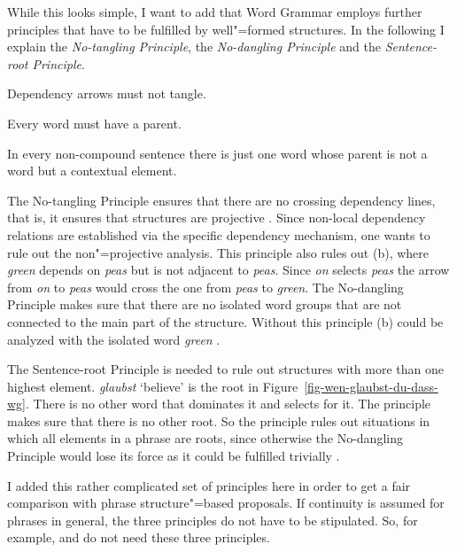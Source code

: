 While this looks simple, I want to add that Word Grammar employs further principles that have to be
fulfilled by well"=formed  structures. In the following I explain the \emph{No-tangling Principle},
the \emph{No-dangling Principle} and the \emph{Sentence-root Principle}.
\begin{principle}
  Dependency arrows must not tangle.
\end{principle}

\begin{principle}
Every word must have a parent.
\end{principle}

\begin{principle}
In every non-compound sentence there is just one word whose parent
is not a word but a contextual element.
\end{principle}

\noindent
The No-tangling Principle ensures that there are no crossing dependency lines, that is, it ensures
that structures are projective \citep[]{Hudson2000a}. Since non-local dependency relations are established via the
specific dependency mechanism, one wants to rule out the non"=projective analysis. This principle
also rules out (b), where \emph{green} depends on \emph{peas} but is not adjacent to
\emph{peas}. Since \emph{on} selects \emph{peas} the arrow from \emph{on} to \emph{peas} would cross
the one from \emph{peas} to \emph{green}.
\eal
{}
\zl
The No-dangling Principle makes sure that there are no isolated word groups that are not connected to the main part
of the structure. Without this principle (b) could be analyzed with the isolated word
\emph{green} \citep[]{Hudson2000a}.

The Sentence-root Principle is needed to rule out structures with more than one highest
element. \emph{glaubst} `believe' is the root in Figure~\ref{fig-wen-glaubst-du-dass-wg}. There is
no other word that dominates it and selects for it. The principle makes sure that there is no other
root. So the principle rules out situations in which all elements in a phrase are roots, since
otherwise the No-dangling Principle would lose its force as it could be fulfilled trivially \citep[]{Hudson2000a}.

I added this rather complicated set of principles here in order to get a fair
comparison with phrase structure"=based proposals. If continuity is assumed for phrases in general,
the three principles do not have to be stipulated. So, for example, \lfg and \hpsg
do not need these three principles.

